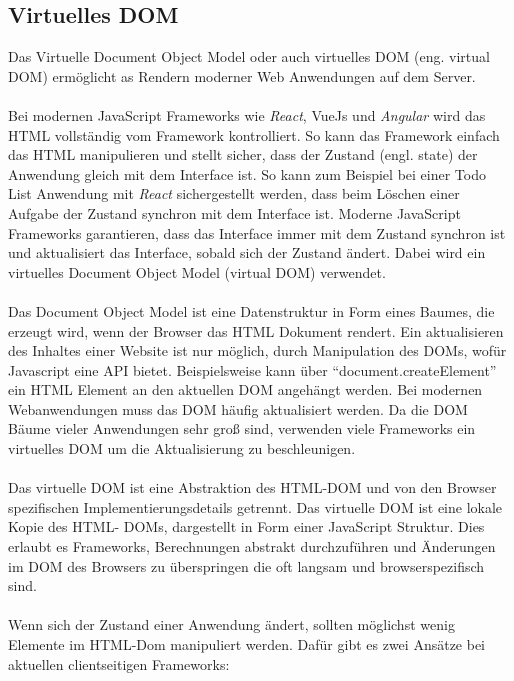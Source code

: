 \documentclass[runningheads]{llncs}
\begin{document}
\subsection{Virtuelles DOM}
\label{subsec:Virtuelles DOM}
Das Virtuelle Document Object Model
oder auch virtuelles DOM (eng. virtual DOM) ermöglicht 
as Rendern moderner Web Anwendungen auf dem Server.
\\
\\
Bei modernen JavaScript Frameworks wie \textit{React}, 
VueJs und \textit{Angular} wird das HTML vollständig vom Framework kontrolliert. 
So kann das Framework einfach das HTML manipulieren und stellt sicher, 
dass der Zustand (engl. state) der Anwendung gleich mit dem Interface ist. 
So kann zum Beispiel bei einer Todo List Anwendung mit \textit{React} sichergestellt werden, 
dass beim Löschen einer Aufgabe der Zustand synchron mit dem Interface ist. 
Moderne JavaScript Frameworks garantieren, 
dass das Interface immer mit dem Zustand synchron ist und aktualisiert das Interface, 
sobald sich der Zustand ändert. 
Dabei wird ein virtuelles Document Object Model (virtual DOM) verwendet.
\\
\\
Das Document Object Model ist eine Datenstruktur in Form eines Baumes, 
die erzeugt wird, wenn der Browser das HTML Dokument rendert. 
Ein aktualisieren des Inhaltes einer Website ist nur möglich, 
durch Manipulation des DOMs, wofür Javascript eine API bietet. 
Beispielsweise kann über “document.createElement” ein HTML Element 
an den aktuellen DOM angehängt werden. 
Bei modernen Webanwendungen muss das DOM häufig aktualisiert werden. 
Da die DOM Bäume vieler Anwendungen sehr groß sind, 
verwenden viele Frameworks ein virtuelles DOM um die 
Aktualisierung zu beschleunigen. 
\\
\\
Das virtuelle DOM ist eine Abstraktion des HTML-DOM und 
von den Browser spezifischen Implementierungsdetails getrennt. 
Das virtuelle DOM ist eine lokale Kopie des HTML- DOMs, 
dargestellt in Form einer JavaScript Struktur. 
Dies erlaubt es Frameworks, 
Berechnungen abstrakt durchzuführen und Änderungen im DOM des Browsers 
zu überspringen die oft langsam und browserspezifisch sind.
\\
\\
Wenn sich der Zustand einer Anwendung ändert, 
sollten möglichst wenig Elemente im HTML-Dom manipuliert werden. 
Dafür gibt es zwei Ansätze bei aktuellen clientseitigen Frameworks:
\end{document}
